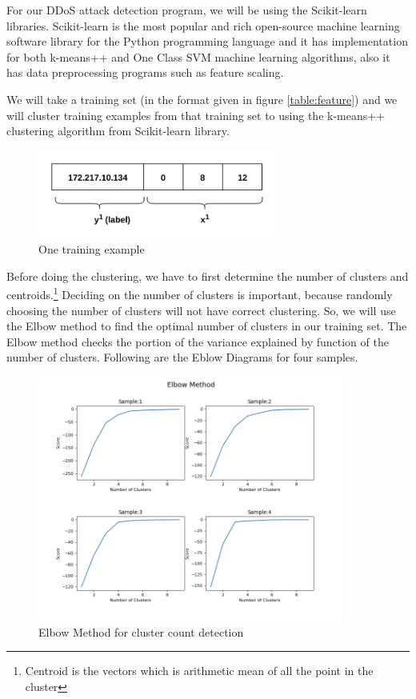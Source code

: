 \documentclass[12pt,oneside,a4paper]{article}
\begin{document}
For our DDoS attack detection program, we will be using the Scikit-learn libraries. Scikit-learn is the most popular and rich open-source machine learning software library for the Python programming language and it has implementation for both k-means++ and One Class SVM machine learning algorithms, also it has data preprocessing programs such as feature scaling.

We will take a training set (in the format given in figure \ref{table:feature}) and we will cluster training examples from that training set to using the k-means++ clustering algorithm from Scikit-learn library.

\begin{figure}[H]
\centering
\includegraphics[width=0.70\textwidth]{training_example.png}
\caption{One training example} \label{fig:training_example}
\end{figure}

Before doing the clustering, we have to first determine the number of clusters and centroids.\footnote{Centroid is the vectors which is arithmetic mean of all the point in the cluster} Deciding on the number of clusters is important, because randomly choosing the number of clusters will not have correct clustering. So, we will use the Elbow method to find the optimal number of clusters in our training set. The Elbow method checks the portion of the variance explained by function of the number of clusters. Following are the Eblow Diagrams for four samples.

\begin{figure}[H]
\centering
\includegraphics[width=0.90\textwidth]{elbow-method.png}
\caption{Elbow Method for cluster count detection} \label{fig:elbowmethod}
\end{figure}
\end{document}
